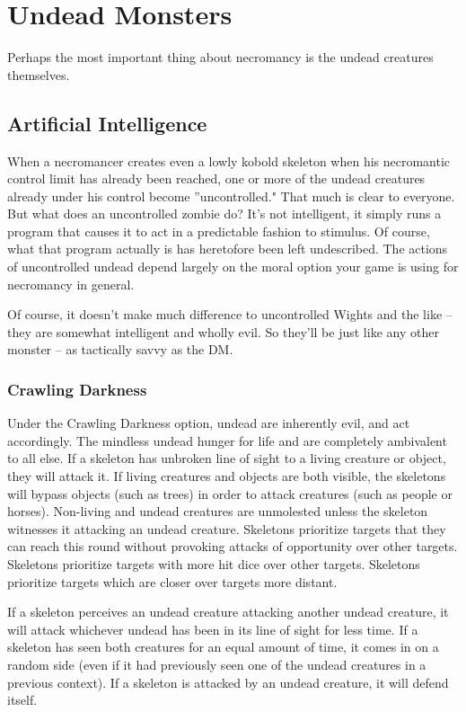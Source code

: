 \section{Undead Monsters}

Perhaps the most important thing about necromancy is the undead creatures themselves.

\subsection{Artificial Intelligence}

When a necromancer creates even a lowly kobold skeleton when his necromantic control limit has already been reached, one or more of the undead creatures already under his control become ''uncontrolled." That much is clear to everyone. But what does an uncontrolled zombie do? It's not intelligent, it simply runs a program that causes it to act in a predictable fashion to stimulus. Of course, what that program actually is has heretofore been left undescribed. The actions of uncontrolled undead depend largely on the moral option your game is using for necromancy in general.

Of course, it doesn't make much difference to uncontrolled Wights and the like -- they are somewhat intelligent and wholly evil. So they'll be just like any other monster -- as tactically savvy as the DM.

\subsubsection{Crawling Darkness}

Under the Crawling Darkness option, undead are inherently evil, and act accordingly. The mindless undead hunger for life and are completely ambivalent to all else. If a skeleton has unbroken line of sight to a living creature or object, they will attack it. If living creatures and objects are both visible, the skeletons will bypass objects (such as trees) in order to attack creatures (such as people or horses). Non-living and undead creatures are unmolested unless the skeleton witnesses it attacking an undead creature. Skeletons prioritize targets that they can reach this round without provoking attacks of opportunity over other targets. Skeletons prioritize targets with more hit dice over other targets. Skeletons prioritize targets which are closer over targets more distant.

If a skeleton perceives an undead creature attacking another undead creature, it will attack whichever undead has been in its line of sight for less time. If a skeleton has seen both creatures for an equal amount of time, it comes in on a random side (even if it had previously seen one of the undead creatures in a previous context). If a skeleton is attacked by an undead creature, it will defend itself.

